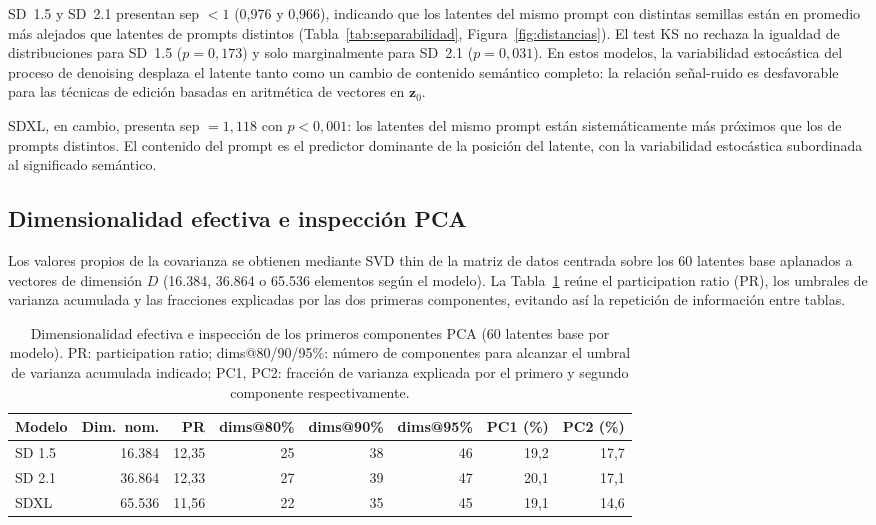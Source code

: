 \documentclass[12pt, a4paper, twoside]{book}
\newcommand{\z}{\mathbf{z}}
\begin{document}
SD~1.5 y SD~2.1 presentan sep $< 1$ (0,976 y 0,966), indicando que los latentes del mismo
prompt con distintas semillas están en promedio más alejados que latentes de prompts
distintos (Tabla~\ref{tab:separabilidad}, Figura~\ref{fig:distancias}). El test KS no rechaza
la igualdad de distribuciones para SD~1.5 ($p = 0{,}173$) y solo marginalmente para SD~2.1
($p = 0{,}031$). En estos modelos, la variabilidad estocástica del proceso de denoising
desplaza el latente tanto como un cambio de contenido semántico completo: la relación
señal-ruido es desfavorable para las técnicas de edición basadas en aritmética de vectores
en $\z_0$.

SDXL, en cambio, presenta sep $= 1{,}118$ con $p < 0{,}001$: los latentes del mismo prompt
están sistemáticamente más próximos que los de prompts distintos. El contenido del prompt
es el predictor dominante de la posición del latente, con la variabilidad estocástica
subordinada al significado semántico.

\subsection{Dimensionalidad efectiva e inspección PCA}
\label{subsec:res:dimensionalidad}

Los valores propios de la covarianza se obtienen mediante SVD thin de la matriz de datos
centrada sobre los 60 latentes base aplanados a vectores de dimensión $D$ (16.384, 36.864
o 65.536 elementos según el modelo). La Tabla~\ref{tab:dimensionalidad} reúne el participation
ratio (PR), los umbrales de varianza acumulada y las fracciones explicadas por las dos primeras
componentes, evitando así la repetición de información entre tablas.

\begin{table}[htb]
\centering
\caption{Dimensionalidad efectiva e inspección de los primeros componentes PCA (60 latentes
base por modelo). PR: participation ratio; dims@80/90/95\%: número de componentes para
alcanzar el umbral de varianza acumulada indicado; PC1, PC2: fracción de varianza explicada
por el primero y segundo componente respectivamente.}
\label{tab:dimensionalidad}
\small
\begin{tabular}{lrrrrrrr}
\toprule
\textbf{Modelo} & \textbf{Dim.\ nom.} & \textbf{PR} & \textbf{dims@80\%} &
\textbf{dims@90\%} & \textbf{dims@95\%} & \textbf{PC1 (\%)} & \textbf{PC2 (\%)} \\
\midrule
SD 1.5 & 16.384 & 12,35 & 25 & 38 & 46 & 19,2 & 17,7 \\
SD 2.1 & 36.864 & 12,33 & 27 & 39 & 47 & 20,1 & 17,1 \\
SDXL   & 65.536 & 11,56 & 22 & 35 & 45 & 19,1 & 14,6 \\
\bottomrule
\end{tabular}
\end{table}
\end{document}

